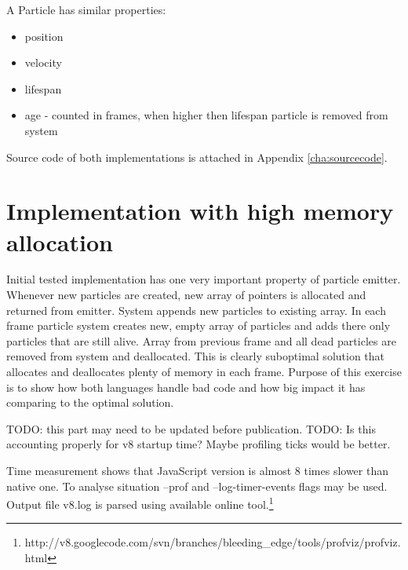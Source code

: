 A Particle has similar properties:
\begin{itemize}
	\item position
	\item velocity
	\item lifespan
	\item age - counted in frames, when higher then lifespan particle is removed from system
\end{itemize}

Source code of both implementations is attached in Appendix \ref{cha:sourcecode}.

\section{Implementation with high memory allocation}
\label{sec:particlesinitial}

Initial tested implementation has one very important property of particle emitter. Whenever new particles are created, new array of pointers is allocated and returned from emitter. System appends new particles to existing array. In each frame particle system creates new, empty array of particles and adds there only particles that are still alive. Array from previous frame and all dead particles are removed from system and deallocated. This is clearly suboptimal solution that allocates and deallocates plenty of memory in each frame. Purpose of this exercise is to show how both languages handle bad code and how big impact it has comparing to the optimal solution.

TODO: this part may need to be updated before publication.
TODO: Is this accounting properly for v8 startup time? Maybe profiling ticks would be better.




Time measurement shows that JavaScript version is almost 8 times slower than native one. To analyse situation --prof and --log-timer-events flags may be used. Output file v8.log is parsed using available online tool.\footnote{http://v8.googlecode.com/svn/branches/bleeding\_edge/tools/profviz/profviz.html}



